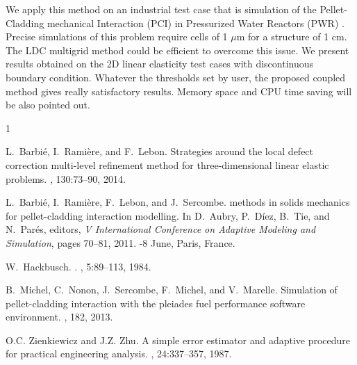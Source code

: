 \documentclass{report}
\begin{document}
We apply this method on an industrial test case that is simulation of the
Pellet-Cladding mechanical Interaction (PCI) in Pressurized Water
Reactors (PWR) \cite{Michel13}. Precise simulations of this problem
require cells of 1 $\mu$m for a structure of 1 cm. The LDC multigrid
method could be efficient to overcome this issue. We present results
obtained on the 2D linear elasticity test cases with discontinuous
boundary condition. Whatever the thresholds set by user, the proposed
coupled method gives really satisfactory results. Memory space and CPU
time saving will be also pointed out.

\begin{thebibliography}{1}

L.~Barbi{\'e}, I.~Rami{\`e}re, and F.~Lebon.
\newblock Strategies around the local defect correction multi-level refinement
method for three-dimensional linear elastic problems.
, 130:73--90, 2014.

L.~Barbi{\'e}, I.~Rami{\`e}re, F.~Lebon, and J.~Sercombe.
 methods in solids mechanics for pellet-cladding interaction
modelling.
\newblock In D.~Aubry, P.~D\'iez, B.~Tie, and N.~Par{\'e}s, editors, {\em V
International Conference on Adaptive Modeling and Simulation}, pages 70--81,
2011.
-8 June, Paris, France.

W.~Hackbusch.
.
, 5:89--113, 1984.

B.~Michel, C.~Nonon, J.~Sercombe, F.~Michel, and V.~Marelle.
\newblock Simulation of pellet-cladding interaction with the pleiades fuel
performance software environment.
, 182, 2013.

O.C. Zienkiewicz and J.Z. Zhu.
\newblock A simple error estimator and adaptive procedure for practical
engineering analysis.
,
24:337--357, 1987.

\end{thebibliography}
\end{document}

